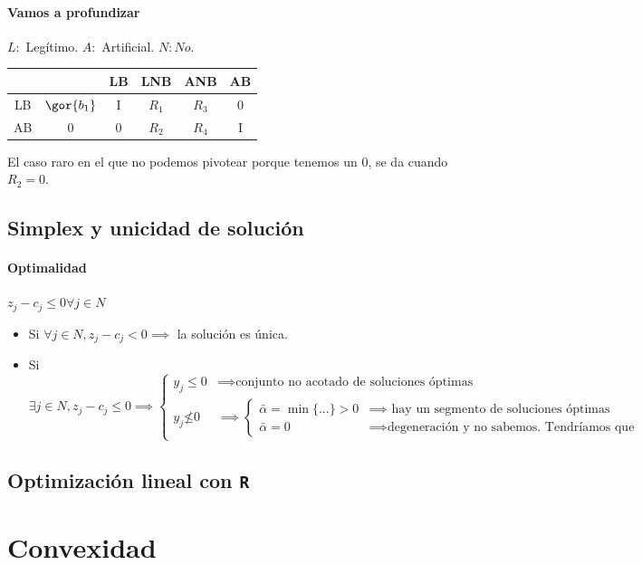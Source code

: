 \paragraph{Vamos a profundizar}
$L:$ Legítimo.
$A:$ Artificial.
$N: No$.
\begin{table}[hbtp]
\centering
\begin{tabular}{c||ccccc}
&&LB&LNB&ANB&AB\\\hline\hline
LB&$\gor{b_1}$&I&$R_1$&$R_3$&0\\
AB&0&0&$R_2$&$R_4$&I
\end{tabular}
\end{table}

El caso raro en el que no podemos pivotear porque tenemos un $0$, se da cuando $R_2 = 0$.

\subsection{Simplex y unicidad de solución}

\paragraph{Optimalidad} $z_j - c_j ≤ 0 ∀j∈N$

\begin{itemize}
	\item Si $∀j∈N, z_j - c_j < 0 \implies$ la solución es única.
	\item Si
		\[∃j∈N, z_j - c_j ≤ 0 \implies
			\left\{
				\begin{array}{cc}
					y_j ≤ 0 & \implies \text{conjunto no acotado de soluciones óptimas}\\
					y_j\not ≤0 &\implies
						\left\{
							\begin{array}{cc}
								\bar{α} = \min\{...\} > 0 &\implies \text{ hay un segmento de soluciones óptimas}\\
								\bar{α} = 0 &\implies  \text{degeneración y no sabemos. Tendríamos que pivotear y ver qué pasa}
							\end{array}
						\right.
				\end{array}
			\right.
		\]
\end{itemize}


\subsection{Optimización lineal con {\tt R}}

\section{Convexidad}

